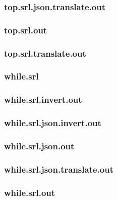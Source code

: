 \subsubsection{top.srl.json.translate.out}
\label{app:top_srl.json.translate.out}

\subsubsection{top.srl.out}
\label{app:top_srl.out}

\subsubsection{top.srl.translate.out}
\label{app:top_srl.translate.out}

\subsubsection{while.srl}
\label{app:while_srl}

\subsubsection{while.srl.invert.out}
\label{app:while_srl.invert.out}

\subsubsection{while.srl.json.invert.out}
\label{app:while_srl.json.invert.out}

\subsubsection{while.srl.json.out}
\label{app:while_srl.json.out}

\subsubsection{while.srl.json.translate.out}
\label{app:while_srl.json.translate.out}

\subsubsection{while.srl.out}
\label{app:while_srl.out}

